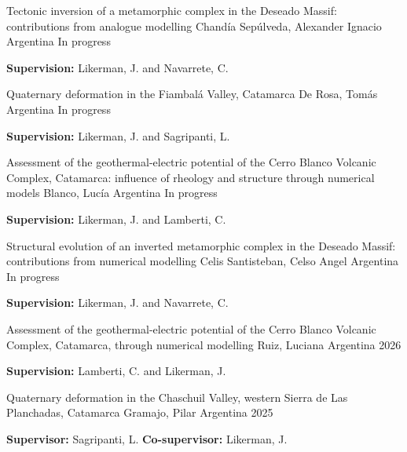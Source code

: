 \begin{cventries}
\cventry
    {Tectonic inversion of a metamorphic complex in the Deseado Massif: contributions from analogue modelling}
    {Chandía Sepúlveda, Alexander Ignacio}
    {Argentina}
    {In progress}
    {
      \begin{cvitems}
        \item {\textbf{Supervision:} Likerman, J. and Navarrete, C.}
      \end{cvitems}
    }

\cventry
    {Quaternary deformation in the Fiambalá Valley, Catamarca}
    {De Rosa, Tomás}
    {Argentina}
    {In progress}
    {
      \begin{cvitems}
        \item {\textbf{Supervision:} Likerman, J. and Sagripanti, L.}
      \end{cvitems}
    }

\cventry
    {Assessment of the geothermal-electric potential of the Cerro Blanco Volcanic Complex, Catamarca: influence of rheology and structure through numerical models}
    {Blanco, Lucía}
    {Argentina}
    {In progress}
    {
      \begin{cvitems}
        \item {\textbf{Supervision:} Likerman, J. and Lamberti, C.}
      \end{cvitems}
    }

\cventry
    {Structural evolution of an inverted metamorphic complex in the Deseado Massif: contributions from numerical modelling}
    {Celis Santisteban, Celso Angel}
    {Argentina}
    {In progress}
    {
      \begin{cvitems}
        \item {\textbf{Supervision:} Likerman, J. and Navarrete, C.}
      \end{cvitems}
    }

\cventry
    {Assessment of the geothermal-electric potential of the Cerro Blanco Volcanic Complex, Catamarca, through numerical modelling}
    {Ruiz, Luciana}
    {Argentina}
    {2026}
    {
      \begin{cvitems}
        \item {\textbf{Supervision:} Lamberti, C. and Likerman, J.}
      \end{cvitems}
    }

\cventry
    {Quaternary deformation in the Chaschuil Valley, western Sierra de Las Planchadas, Catamarca}
    {Gramajo, Pilar}
    {Argentina}
    {2025}
    {
      \begin{cvitems}
        \item {\textbf{Supervisor:} Sagripanti, L. \textbf{Co-supervisor:} Likerman, J.}
      \end{cvitems}
    }


\end{cventries}
